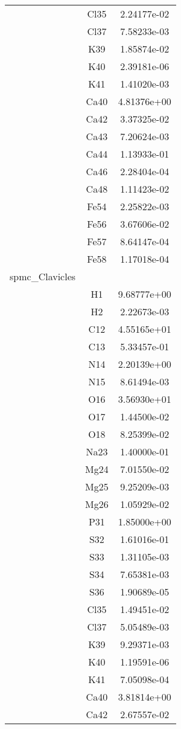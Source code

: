 \begin{centering}
\begin{longtable}{l c c}
& Cl35 & 2.24177e-02 \\ 
& Cl37 & 7.58233e-03 \\ 
& K39 & 1.85874e-02 \\ 
& K40 & 2.39181e-06 \\ 
& K41 & 1.41020e-03 \\ 
& Ca40 & 4.81376e+00 \\ 
& Ca42 & 3.37325e-02 \\ 
& Ca43 & 7.20624e-03 \\ 
& Ca44 & 1.13933e-01 \\ 
& Ca46 & 2.28404e-04 \\ 
& Ca48 & 1.11423e-02 \\ 
& Fe54 & 2.25822e-03 \\ 
& Fe56 & 3.67606e-02 \\ 
& Fe57 & 8.64147e-04 \\ 
& Fe58 & 1.17018e-04 \\ 
\hline
spmc_Clavicles & & \\
\hline
& H1 & 9.68777e+00 \\ 
& H2 & 2.22673e-03 \\ 
& C12 & 4.55165e+01 \\ 
& C13 & 5.33457e-01 \\ 
& N14 & 2.20139e+00 \\ 
& N15 & 8.61494e-03 \\ 
& O16 & 3.56930e+01 \\ 
& O17 & 1.44500e-02 \\ 
& O18 & 8.25399e-02 \\ 
& Na23 & 1.40000e-01 \\ 
& Mg24 & 7.01550e-02 \\ 
& Mg25 & 9.25209e-03 \\ 
& Mg26 & 1.05929e-02 \\ 
& P31 & 1.85000e+00 \\ 
& S32 & 1.61016e-01 \\ 
& S33 & 1.31105e-03 \\ 
& S34 & 7.65381e-03 \\ 
& S36 & 1.90689e-05 \\ 
& Cl35 & 1.49451e-02 \\ 
& Cl37 & 5.05489e-03 \\ 
& K39 & 9.29371e-03 \\ 
& K40 & 1.19591e-06 \\ 
& K41 & 7.05098e-04 \\ 
& Ca40 & 3.81814e+00 \\ 
& Ca42 & 2.67557e-02 \\ 

\end{longtable}
\end{centering}
